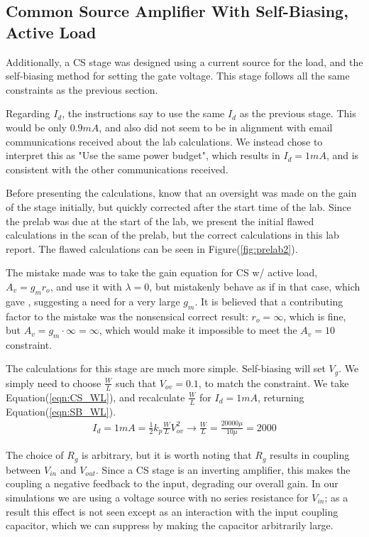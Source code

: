\documentclass[11pt]{article}
\begin{document}
	\subsection{Common Source Amplifier With Self-Biasing, Active Load}
		Additionally, a CS stage was designed using a current source for the load, and the self-biasing method for setting the gate voltage. This stage follows all the same constraints as the previous section.
		
		Regarding $I_d$, the instructions say to use the same $I_d$ as the previous stage. This would be only $0.9mA$, and also did not seem to be in alignment with email communications received about the lab calculations. We instead chose to interpret this as "Use the same power budget", which results in $I_d = 1mA$, and is consistent with the other communications received.
		
		Before presenting the calculations, know that an oversight was made on the gain of the stage initially, but quickly corrected after the start time of the lab. Since the prelab was due at the start of the lab, we present the initial flawed calculations in the scan of the prelab, but the correct calculations in this lab report. The flawed calculations can be seen in Figure(\ref{fig:prelab2}).
		
		The mistake made was to take the gain equation for CS w/ active load, $A_v = g_m r_o$, and use it with $\lambda = 0$, but mistakenly behave as if  in that case, which gave , suggesting a need for a very large $g_m$. It is believed that a contributing factor to the mistake was the nonsensical correct result: $r_o = \infty$, which is fine, but $A_v = g_m \cdot \infty = \infty$, which would make it impossible to meet the $A_v = 10$ constraint.
		
		The calculations for this stage are much more simple. Self-biasing will set $V_g$. We simply need to choose $\frac{W}{L}$ such that $V_{ov} = 0.1$, to match the constraint. We take Equation(\ref{eqn:CS_WL}), and recalculate $\frac{W}{L}$ for $I_d = 1mA$, returning Equation(\ref{eqn:SB_WL}).
		\begin{align}\label{eqn:SB_WL} I_d = 1mA = \frac{1}{2} k_p \frac{W}{L} V_{ov}^2 \rightarrow \frac{W}{L} = \frac{20000\mu}{10\mu} = 2000 \end{align}
		
		
		The choice of $R_g$ is arbitrary, but it is worth noting that $R_g$ results in coupling between $V_{in}$ and $V_{out}$. Since a CS stage is an inverting amplifier, this makes the coupling a negative feedback to the input, degrading our overall gain. In our simulations we are using a voltage source with no series resistance for $V_{in}$; as a result this effect is not seen except as an interaction with the input coupling capacitor, which we can suppress by making the capacitor arbitrarily large.
		
\end{document}
